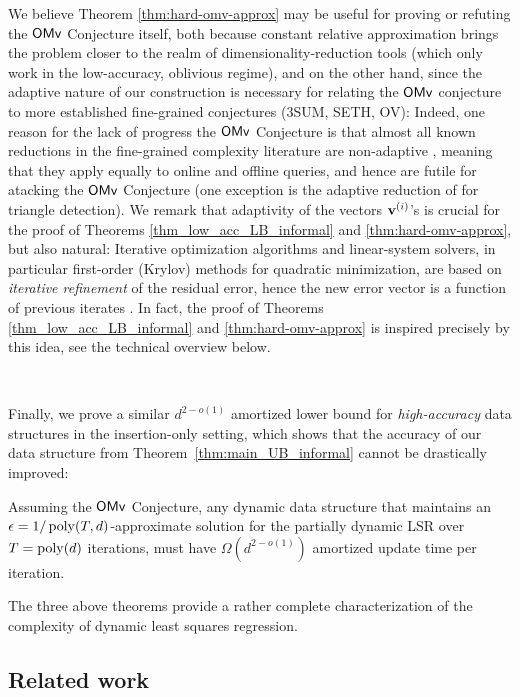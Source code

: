 We believe Theorem \ref{thm:hard-omv-approx} may be useful for proving or refuting the $\mathsf{OMv}$ Conjecture itself, both because constant relative approximation brings the problem closer to the realm of dimensionality-reduction tools (which only work in the low-accuracy, oblivious regime), and on the other hand, since the adaptive nature of our construction is necessary for relating the $\mathsf{OMv}$ conjecture to more established fine-grained conjectures (3SUM, SETH, OV): 
Indeed, 
one reason for the lack of progress the $\mathsf{OMv}$ Conjecture is that almost all known reductions in the fine-grained complexity literature are non-adaptive \cite{W18survey}, meaning that they apply equally to online and offline queries, and hence are futile for atacking the $\mathsf{OMv}$ Conjecture (one exception is the adaptive reduction of \cite{WW18} for triangle detection).
We remark that adaptivity of the vectors $\mathbf{v}^{(i)}$'s is crucial for the proof of Theorems \ref{thm_low_acc_LB_informal} and \ref{thm:hard-omv-approx}, but also natural:   Iterative optimization algorithms and linear-system solvers, in particular first-order (Krylov) methods for quadratic minimization, are based on \emph{iterative refinement} of the residual error, hence the new error vector is a function of previous iterates \cite{wilkinson1994rounding,hestenes1952methods,akps19}. 
In fact, the proof of Theorems \ref{thm_low_acc_LB_informal} and \ref{thm:hard-omv-approx} is inspired precisely by this idea, see the technical overview below.

\

Finally, we prove a similar $d^{2-o(1)}$ amortized lower bound for \emph{high-accuracy} data structures   in the insertion-only setting, which shows that the accuracy  of our data structure from Theorem~\ref{thm:main_UB_informal} cannot be drastically improved:  

\begin{theorem} \label{thm_exact_LB_informal}
Assuming the $\mathsf{OMv}$ Conjecture, any dynamic data structure that maintains an $\epsilon=1/\operatorname{poly}(T, d)$-approximate solution for the partially dynamic LSR over $T = \operatorname{poly}(d)$ iterations, must have $\Omega(d^{2-o(1)})$ amortized update time per iteration.
\end{theorem}


The three above theorems provide a rather complete characterization of the complexity of dynamic least squares regression.
 


\subsection{Related work}


